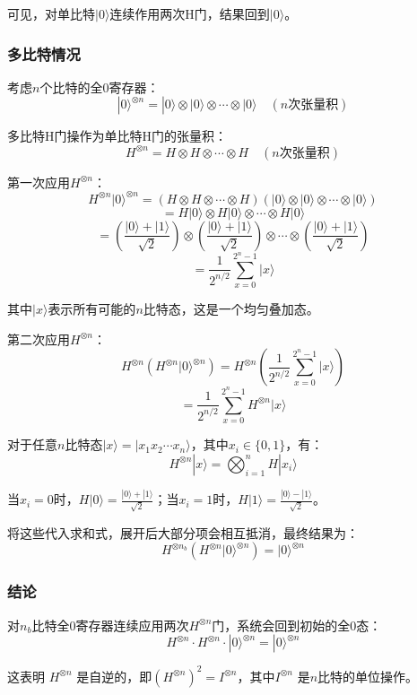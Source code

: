\documentclass{article}
\begin{document}
可见，对单比特$|0\rangle$连续作用两次H门，结果回到$|0\rangle$。

\subsubsection{多比特情况}

考虑$n$个比特的全0寄存器：
\[
|0\rangle^{\otimes n} = |0\rangle \otimes |0\rangle \otimes \cdots \otimes |0\rangle \quad (n \text{次张量积})
\]

多比特H门操作为单比特H门的张量积：
\[
H^{\otimes n} = H \otimes H \otimes \cdots \otimes H \quad (n \text{次张量积})
\]

第一次应用$H^{\otimes n}$：
\[
H^{\otimes n}|0\rangle^{\otimes n} = (H \otimes H \otimes \cdots \otimes H)(|0\rangle \otimes |0\rangle \otimes \cdots \otimes |0\rangle)
\]
\[
= H|0\rangle \otimes H|0\rangle \otimes \cdots \otimes H|0\rangle
\]
\[
= \left(\frac{|0\rangle + |1\rangle}{\sqrt{2}}\right) \otimes \left(\frac{|0\rangle + |1\rangle}{\sqrt{2}}\right) \otimes \cdots \otimes \left(\frac{|0\rangle + |1\rangle}{\sqrt{2}}\right)
\]
\[
= \frac{1}{2^{n/2}} \sum_{x=0}^{2^{n}-1} |x\rangle
\]

其中$|x\rangle$表示所有可能的$n$比特态，这是一个均匀叠加态。

第二次应用$H^{\otimes n}$：
\[
H^{\otimes n}\left(H^{\otimes n}|0\rangle^{\otimes n}\right) = H^{\otimes n}\left(\frac{1}{2^{n/2}} \sum_{x=0}^{2^{n}-1} |x\rangle\right)
\]
\[
= \frac{1}{2^{n/2}} \sum_{x=0}^{2^{n}-1} H^{\otimes n}|x\rangle
\]

对于任意$n$比特态$|x\rangle = |x_1x_2\cdots x_n\rangle$，其中$x_i \in \{0,1\}$，有：
\[
H^{\otimes n}|x\rangle = \bigotimes_{i=1}^{n} H|x_i\rangle
\]

当$x_i = 0$时，$H|0\rangle = \frac{|0\rangle + |1\rangle}{\sqrt{2}}$；当$x_i = 1$时，$H|1\rangle = \frac{|0\rangle - |1\rangle}{\sqrt{2}}$。

将这些代入求和式，展开后大部分项会相互抵消，最终结果为：
\[
H^{\otimes n_b}\left(H^{\otimes n}|0\rangle^{\otimes n}\right) = |0\rangle^{\otimes n}
\]

\subsubsection{结论}

对$n_b$比特全0寄存器连续应用两次$H^{\otimes n}$门，系统会回到初始的全0态：
\[
H^{\otimes n} \cdot H^{\otimes n} \cdot |0\rangle^{\otimes n} = |0\rangle^{\otimes n}
\]

这表明 \(H^{\otimes n}\) 是自逆的，即${{\left( H^{\otimes n} \right)}^2} = I^{\otimes n}$，其中\(I^{\otimes n}\) 是$n$比特的单位操作。
\end{document}
